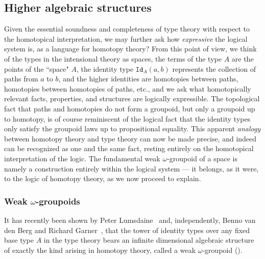 \documentclass[reqno,12pt]{amsart}
\newcommand{\id}[1]{\texttt{Id}_{#1}}
\theoremstyle{definition}
\theoremstyle{remark}
\begin{document}
\subsection{Higher algebraic structures}\label{subsec:groupoid}

Given the essential soundness and completeness of type theory with respect to the homotopical interpretation, we may further ask how \emph{expressive} the logical system is, as a language for homotopy theory?  From this point of view, we think of the types in the intensional theory as spaces,  the terms of the type $A$\/ are the points of the ``space" $A$, the identity type $\id{A}(a,b)$\/ represents the collection of paths from $a$\/ to $b$, and the higher identities are homotopies between paths,  homotopies between homotopies of paths, etc., and we ask what homotopically relevant facts, properties, and structures are logically expressible. The topological fact that paths and homotopies do not form a groupoid, but only a groupoid up to homotopy, is of course reminiscent of the logical fact that the identity types only satisfy the groupoid laws up to propositional equality. This apparent \emph{analogy} between homotopy theory and type theory can now be made precise, and indeed can be recognized as one and the same fact, resting entirely on the homotopical interpretation of the logic.  The fundamental weak $\omega$-groupoid of a space is namely a construction entirely within the logical system --- it belongs, as it were, to the logic of homotopy theory, as we now proceed to explain.

\subsubsection{Weak $\omega$-groupoids}

It has recently been shown by Peter Lumsdaine~\cite{Lumsdaine:WOITT} and, independently, Benno van den Berg and Richard Garner~\cite{Berg:TWOG,benno:talk}, that the tower of identity types over any fixed base type $A$\/ in the type theory bears an infinite dimensional algebraic structure of exactly the kind arising in homotopy theory, called a weak $\omega$-groupoid (\cite{Kapranov:OGHT,Leinster:survey,cheng:duals-give-inverses,Brown:FGTG}).
\end{document}
